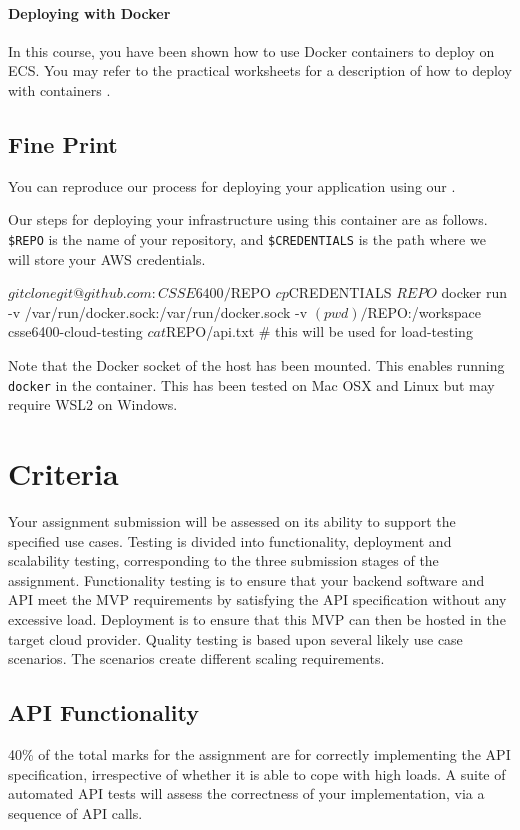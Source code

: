 \documentclass{csse4400}
\begin{document}
\paragraph{Deploying with Docker}
In this course, you have been shown how to use Docker containers to deploy on ECS. You may refer to the practical worksheets for a description of how to deploy with containers \cite{prac-week5}.

\subsection{Fine Print}
You can reproduce our process for deploying your application using our .

Our steps for deploying your infrastructure using this container are as follows.
\texttt{\$REPO} is the name of your repository, and
\texttt{\$CREDENTIALS} is the path where we will store your AWS credentials.
\begin{code}[language=shell]{}
$ git clone git@github.com:CSSE6400/$REPO
$ cp $CREDENTIALS $REPO
$ docker run -v /var/run/docker.sock:/var/run/docker.sock -v $(pwd)/$REPO:/workspace csse6400-cloud-testing
$ cat $REPO/api.txt # this will be used for load-testing
\end{code}

Note that the Docker socket of the host has been mounted. This enables running \texttt{docker} in the container. This has been tested on Mac OSX and Linux but may require WSL2 on Windows.


\section{Criteria}
Your assignment submission will be assessed on its ability to support the specified use cases.
Testing is divided into functionality, deployment and scalability testing, corresponding to the three submission stages of the assignment.
Functionality testing is to ensure that your backend software and API meet the MVP requirements by satisfying the API specification without any excessive load.
Deployment is to ensure that this MVP can then be hosted in the target cloud provider.
Quality testing is based upon several likely use case scenarios.
The scenarios create different scaling requirements.

\subsection{API Functionality} %
40\% of the total marks for the assignment are for correctly implementing the API specification, irrespective of whether it is able to cope with high loads. A suite of automated API tests will assess the correctness of your implementation, via a sequence of API calls.
\end{document}
